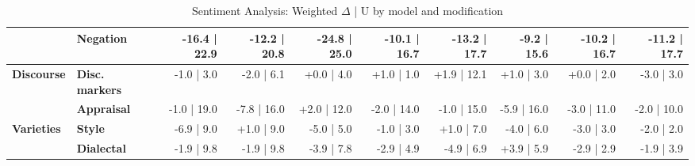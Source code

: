 \begin{table}[h]
{\begin{tabular}{llrrrrrrrr}
  & \textbf{Negation} & -16.4 | 22.9 & -12.2 | 20.8 & -24.8 | 25.0 & -10.1 | 16.7 & -13.2 | 17.7 & -9.2 | 15.6 & -10.2 | 16.7 & -11.2 | 17.7 \\
\midrule
\textbf{Discourse} & \textbf{Disc. markers} & -1.0 | 3.0 & -2.0 | 6.1 & +0.0 | 4.0 & +1.0 | 1.0 & +1.9 | 12.1 & +1.0 | 3.0 & +0.0 | 2.0 & -3.0 | 3.0 \\
  & \textbf{Appraisal} & -1.0 | 19.0 & -7.8 | 16.0 & +2.0 | 12.0 & -2.0 | 14.0 & -1.0 | 15.0 & -5.9 | 16.0 & -3.0 | 11.0 & -2.0 | 10.0 \\
\midrule
\textbf{Varieties} & \textbf{Style} & -6.9 | 9.0 & +1.0 | 9.0 & -5.0 | 5.0 & -1.0 | 3.0 & +1.0 | 7.0 & -4.0 | 6.0 & -3.0 | 3.0 & -2.0 | 2.0 \\
  & \textbf{Dialectal} & -1.9 | 9.8 & -1.9 | 9.8 & -3.9 | 7.8 & -2.9 | 4.9 & -4.9 | 6.9 & +3.9 | 5.9 & -2.9 | 2.9 & -1.9 | 3.9 \\
\bottomrule
\end{tabular}}
\caption{Sentiment Analysis: Weighted $\Delta$ | U by model and modification}\label{tab:sa_combined}
\end{table}